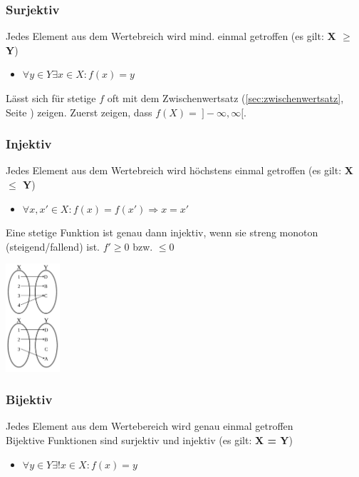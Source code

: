 \documentclass[8pt, a4paper, landscape, fleqn]{scrartcl}
\newenvironment {example}
				{\begin{itshape} \begin{small}}
				{\end{small} \end{itshape}}
\begin{document}
\begin{multicols*}{3}
\begin{minipage}{6.5cm}
			        \subsubsection{Surjektiv}
			        Jedes Element aus dem Wertebreich wird mind. einmal getroffen (es gilt:  \textbf{X $\geq$ Y})\\
			        \vspace{-8pt}
			        \begin{itemize}
						\item $\forall y \in Y \exists x \in X: f(x)=y$
					\end{itemize}
					\begin{example}
					    Lässt sich für stetige $f$ oft mit dem Zwischenwertsatz (\ref{sec:zwischenwertsatz}, Seite \pageref{sec:zwischenwertsatz}) zeigen. Zuerst zeigen, dass $f(X) =\ ]-\infty, \infty[$.
					\end{example}
			    \subsubsection{Injektiv}
			        Jedes Element aus dem Wertebreich wird höchstens einmal getroffen (es gilt:  \textbf{X $\leq$ Y})\\
			        \vspace{-8pt}
			        \begin{itemize}
						\item $\forall x, x' \in X: f(x)=f(x')\Rightarrow x=x'$
					\end{itemize}
				\begin{example}
				    Eine stetige Funktion ist genau dann injektiv, wenn sie streng monoton (steigend/fallend) ist. $f' \geq 0$ bzw. $\leq 0$
				\end{example}
			    \end{minipage}
			    \begin{minipage}{2cm}
			        \includegraphics[width=2cm]{surj-inj.JPG}
			    \end{minipage}
			    \subsubsection{Bijektiv}
			        Jedes Element aus dem Wertebereich wird genau einmal getroffen\\ 
			        Bijektive Funktionen sind surjektiv und injektiv (es gilt:  \textbf{X = Y})\\
			        \vspace{-8pt}
			        \begin{itemize}
						\item $\forall y \in Y \exists ! x \in X: f(x)=y$
					\end{itemize}
					

\end{multicols*}
\end{document}
